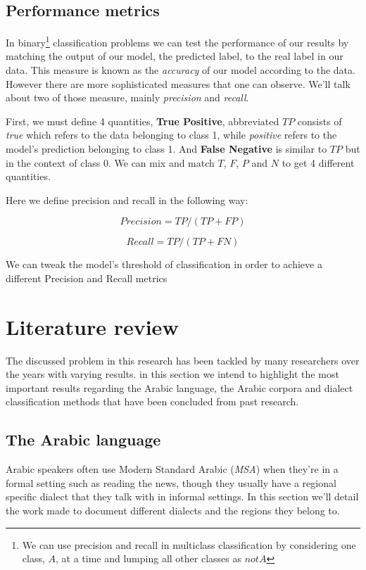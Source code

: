 \documentclass[12pt]{diazessay}
\begin{document}
        
    \subsection{Performance metrics}
    In binary\footnote{We can use precision and recall in multiclass classification by considering one class, \(A\), at a time and lumping all other classes as \(not A\)} classification problems we can test the performance of our results by matching the output of our model, the predicted label, to the real label in our data. This measure is known as the \emph{accuracy} of our model according to the data. However there are more sophisticated measures that one can observe. We'll talk about two of those measure, mainly \emph{precision} and \emph{recall}.
    
    First, we must define 4 quantities, \textbf{True Positive}, abbreviated \(TP\) consists of \emph{true} which refers to the data belonging to class 1, while \emph{positive} refers to the model's prediction belonging to class 1. And \textbf{False Negative} is similar to \(TP\) but in the context of class 0. We can mix and match \(T\), \(F\), \(P\) and \(N\) to get 4 different quantities.
    
    Here we define precision and recall in the following way:
    
    \[Precision = TP / (TP + FP)\]
    
    \[Recall = TP / (TP + FN)\]
    
    We can tweak the model's threshold of classification in order to achieve a different Precision and Recall metrics


\section{Literature review}
The discussed problem in this research has been tackled by many researchers over the years with varying results. in this section we intend to highlight the most important results regarding the Arabic language, the Arabic corpora and dialect classification methods that have been concluded from past research.
    
    
    \subsection{The Arabic language} \label{txt:thearabiclanguage}
    Arabic speakers often use Modern Standard Arabic (\emph{MSA}) when they're in a formal setting such as reading the news, though they usually have a regional specific dialect that they talk with in informal settings. In this section we'll detail the work made to document different dialects and the regions they belong to. 
        
\end{document}
